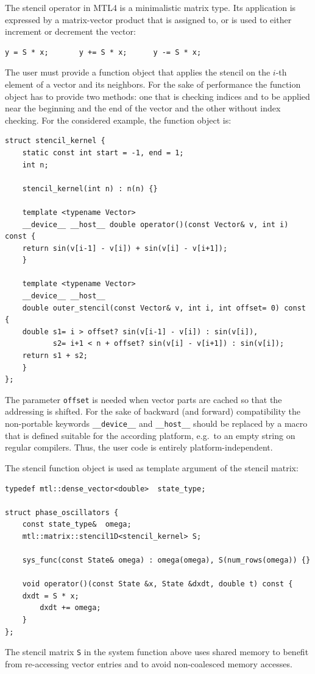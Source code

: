 \documentclass[final]{siamltex}
\newcommand{\code}[1]{\lstinline|#1|}
\begin{document}
The stencil operator in MTL4 is a minimalistic matrix type.
Its application is expressed by a matrix-vector product that is assigned
to, or is used to either increment or decrement the vector:
\begin{lstlisting}
y = S * x;       y += S * x;      y -= S * x;
\end{lstlisting}
The user must provide a function object that applies the stencil on
the $i$-th element of a vector and its neighbors.
For the sake of performance the function object has to provide two methods:
one that is checking indices and to be applied near the beginning and the end
of the vector and the other without index checking.  For the considered
example, the function object is:
\begin{lstlisting}
struct stencil_kernel {
    static const int start = -1, end = 1;
    int n;

    stencil_kernel(int n) : n(n) {}

    template <typename Vector>
    __device__ __host__ double operator()(const Vector& v, int i) const {
	return sin(v[i-1] - v[i]) + sin(v[i] - v[i+1]);
    }

    template <typename Vector>
    __device__ __host__
    double outer_stencil(const Vector& v, int i, int offset= 0) const {
	double s1= i > offset? sin(v[i-1] - v[i]) : sin(v[i]),
	       s2= i+1 < n + offset? sin(v[i] - v[i+1]) : sin(v[i]);
	return s1 + s2;
    }
};
\end{lstlisting}
The parameter \code{offset} is needed when vector parts are cached so that the
addressing is shifted.
For the sake of backward (and forward) compatibility the non-portable keywords
\code{__device__} and \code{__host__} should be replaced by a macro that is
defined suitable for the according platform, e.g.~to an empty string on regular
compilers.  Thus, the user code is entirely platform-independent.

The stencil function object is used as template argument of the stencil matrix:
\begin{lstlisting}
typedef mtl::dense_vector<double>  state_type;

struct phase_oscillators {
    const state_type&  omega;
    mtl::matrix::stencil1D<stencil_kernel> S;

    sys_func(const State& omega) : omega(omega), S(num_rows(omega)) {}

    void operator()(const State &x, State &dxdt, double t) const {
	dxdt = S * x;
        dxdt += omega;
    }
};
\end{lstlisting}
The stencil matrix \code{S} in the system function above
uses shared memory to benefit from re-accessing vector entries
and to avoid non-coalesced memory accesses.
\end{document}

